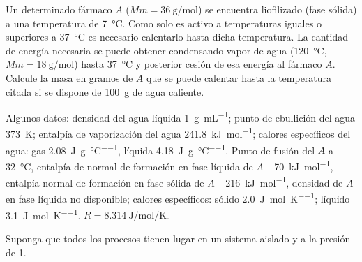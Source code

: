 Un determinado fármaco $A$ ($Mm = \SI{36}{\gram\per\mol}$) se encuentra liofilizado (fase sólida) a una temperatura de \SI{7}{\celsius}. Como solo es activo a temperaturas iguales o superiores a \SI{37}{\celsius} es necesario calentarlo hasta dicha temperatura. La cantidad de energía necesaria se puede obtener condensando vapor de agua (\SI{120}{\celsius}, $Mm = \SI{18}{\gram\per\mol}$) hasta \SI{37}{\celsius} y posterior cesión de esa energía al fármaco $A$. Calcule la masa en gramos de $A$ que se puede calentar hasta la temperatura citada si se dispone de \SI{100}{\gram} de agua caliente.

Algunos datos: densidad del agua líquida \SI{1}{\gram\per\milli\liter}; punto de ebullición del agua \SI{373}{\kelvin}; entalpía de vaporización del agua \SI{241,8}{\kilo\joule\per\mol}; calores específicos del agua: gas \SI{2,08}{\joule\per\gram\per\celsius}, líquida \SI{4,18}{\joule\per\gram\per\celsius}. Punto de fusión del $A$ a \SI{32}{\celsius}, entalpía de normal de formación en fase líquida de $A$ \SI{-70}{\kilo\joule\per\mol}, entalpía normal de formación en fase sólida de $A$ \SI{-216}{\kilo\joule\per\mol}, densidad de $A$ en fase líquida no disponible; calores específicos: sólido \SI{2,0}{\joule\per\mol\per\kelvin}; líquido \SI{3,1}{\joule\per\mol\per\kelvin}. $R = \SI{8,314}{\joule\per\mol\per\kelvin}$.

Suponga que todos los procesos tienen lugar en un sistema aislado y a la presión de \SI{1}{\atm}.

